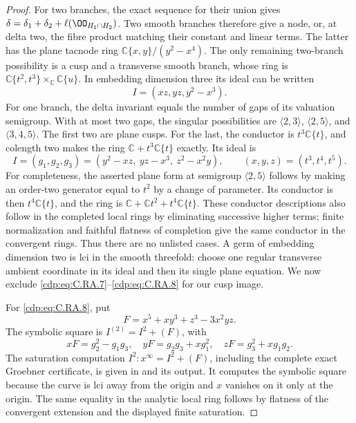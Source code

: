 \begin{proof}
For two branches, the exact sequence for their union gives
$\delta=\delta_1+\delta_2+\ell(\OO_{H_1\cap H_2})$.
Two smooth branches therefore give a node, or, at delta
two, the fibre product matching their constant and linear
terms. The latter has the plane tacnode ring
$\mathbb C\{x,y\}/(y^2-x^4)$.
The only remaining two-branch possibility is a cusp and
a transverse smooth branch, whose ring is
$\mathbb C\{t^2,t^3\}\times_{\mathbb C}\mathbb C\{u\}$.
In embedding dimension three its ideal can be written
\[
                  I=(xz,yz,y^2-x^3).            \tag{C.RA.7}\label{cdp:eq:C.RA.7}
\]
For one branch, the delta invariant equals the number of
gaps of its valuation semigroup. With at most two gaps,
the singular possibilities are
$\langle2,3\rangle$, $\langle2,5\rangle$, and
$\langle3,4,5\rangle$. The first two are plane cusps.
For the last, the conductor is $t^3\mathbb C\{t\}$,
and colength two makes the ring
$\mathbb C+t^3\mathbb C\{t\}$ exactly. Its ideal is
\[
 I=(g_1,g_2,g_3)
   =(y^2-xz,\ yz-x^3,\ z^2-x^2y),\qquad
 (x,y,z)=(t^3,t^4,t^5).                         \tag{C.RA.8}\label{cdp:eq:C.RA.8}
\]
For completeness, the asserted plane form at semigroup
$\langle2,5\rangle$ follows by making an order-two
generator equal to $t^2$ by a change of parameter.
Its conductor is then $t^4\mathbb C\{t\}$, and the ring
is $\mathbb C+\mathbb Ct^2+t^4\mathbb C\{t\}$.
These conductor descriptions also follow in the completed
local rings by eliminating successive higher terms; finite
normalization and faithful flatness of completion give the
same conductor in the convergent rings. Thus there are no
unlisted cases. A germ of embedding dimension two is lci
in the smooth threefold: choose one regular transverse
ambient coordinate in its ideal and then its single plane
equation. We now exclude \eqref{cdp:eq:C.RA.7}--\eqref{cdp:eq:C.RA.8} for our cusp
image.

For \eqref{cdp:eq:C.RA.8}, put
\[
 F=x^5+xy^3+z^3-3x^2yz .
\]
The symbolic square is $I^{(2)}=I^2+(F)$, with
\[
 xF=g_2^2-g_1g_3,\quad
 yF=g_2g_3+xg_1^2,\quad
 zF=g_3^2+xg_1g_2.                              \tag{C.RA.9}\label{cdp:eq:C.RA.9}
\]
The saturation computation $I^2:x^\infty=I^2+(F)$,
including the complete exact Groebner certificate, is
given in  and its output.
It computes the symbolic square because the curve is lci
away from the origin and $x$ vanishes on it only at the
origin. The same equality in the analytic local ring
follows by flatness of the convergent extension and the
displayed finite saturation.


\end{proof}

